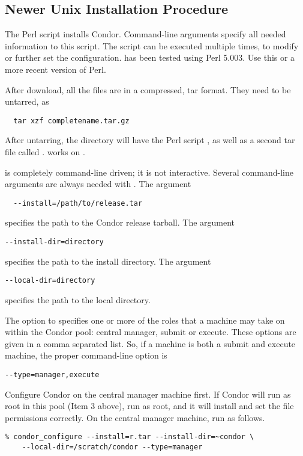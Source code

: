 \subsection{\label{sec:new-install-procedure}
Newer Unix Installation Procedure}

The Perl script  installs Condor.
Command-line arguments specify all needed information to this
script.  The script can be executed multiple times, to modify or further
set the configuration.   has been tested using Perl 5.003.
Use this or a more recent version of Perl.

After download, all the files are in a compressed, tar format.
They need to be untarred, as
\begin{verbatim}
  tar xzf completename.tar.gz
\end{verbatim}
After untarring, the directory will have the Perl script
, as well as a second tar file called
.
 works on .

 is completely command-line driven; it is not interactive.
Several command-line arguments are always needed with .
The argument
\begin{verbatim}
  --install=/path/to/release.tar
\end{verbatim}
specifies the path to the Condor release tarball. 
The argument
\begin{verbatim}
--install-dir=directory
\end{verbatim}
specifies the path to the install directory.
The argument
\begin{verbatim}
--local-dir=directory
\end{verbatim}
specifies the path to the local directory.

The  option to 
specifies one or more of the roles that a machine may take on
within the Condor pool: central manager, submit or execute.
These options are given in a comma separated list.
So, if a machine is both a submit and execute
machine, 
the proper command-line option is
\begin{verbatim}
--type=manager,execute
\end{verbatim}

Configure Condor on the central manager machine first.  If Condor
will run as root in this pool (Item 3 above), run  
as root, and it will install and set the file permissions correctly.  
On the central manager machine, run  as follows.
\begin{verbatim}
% condor_configure --install=r.tar --install-dir=~condor \
	--local-dir=/scratch/condor --type=manager
\end{verbatim}

